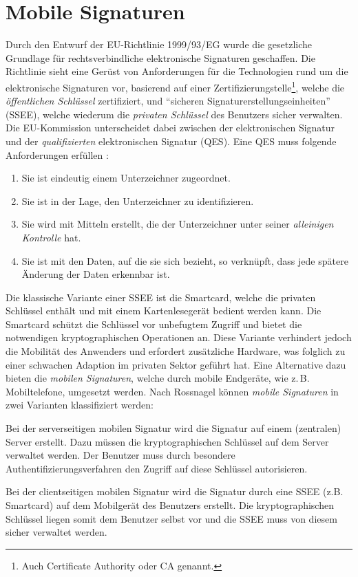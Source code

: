 \documentclass[11pt,a4paper,ngerman]{scrreprt}
\begin{document}
\section{Mobile Signaturen}\label{sec:MobileSignaturen}
Durch den Entwurf der EU-Richtlinie 1999/93/EG wurde die gesetzliche Grundlage für rechtsverbindliche elektronische Signaturen geschaffen. Die Richtlinie sieht eine Gerüst von Anforderungen für die Technologien rund um die elektronische Signaturen vor, basierend auf einer Zertifizierungstelle\footnote{Auch Certificate Authority oder CA genannt.}, welche die \emph{öffentlichen Schlüssel} zertifiziert, und ``sicheren Signaturerstellungseinheiten'' (SSEE), welche wiederum die \emph{privaten Schlüssel} des Benutzers sicher verwalten. Die EU-Kommission unterscheidet dabei zwischen der elektronischen Signatur und der \emph{qualifizierten} elektronischen Signatur (QES). Eine QES muss folgende Anforderungen erfüllen \cite{eSigEU99}:
\begin{enumerate}
    \item Sie ist eindeutig einem Unterzeichner zugeordnet.
    \item Sie ist in der Lage, den Unterzeichner zu identifizieren.
    \item Sie wird mit Mitteln erstellt, die der Unterzeichner unter seiner \emph{alleinigen Kontrolle} hat.
    \item Sie ist mit den Daten, auf die sie sich bezieht, so verknüpft, dass jede spätere Änderung der Daten erkennbar ist.
\end{enumerate}
Die klassische Variante einer SSEE ist die Smartcard, welche die privaten Schlüssel enthält und mit einem Kartenlesegerät bedient werden kann. Die Smartcard schützt die Schlüssel vor unbefugtem Zugriff und bietet die notwendigen kryptographischen Operationen an. Diese Variante verhindert jedoch die Mobilität des Anwenders und erfordert zusätzliche Hardware, was folglich zu einer schwachen Adaption im privaten Sektor geführt hat. Eine Alternative dazu bieten die \textit{mobilen Signaturen}, welche durch mobile Endgeräte, wie z.\,B. Mobiltelefone, umgesetzt werden. Nach Rossnagel \cite{rossnagel} können \textit{mobile Signaturen} in zwei Varianten klassifiziert werden:
\begin{description}[font=\rmfamily]
    \item [Serverseitige mobile Signaturen] Bei der serverseitigen mobilen Signatur wird die Signatur auf einem (zentralen) Server erstellt. Dazu müssen die kryptographischen Schlüssel auf dem Server verwaltet werden. Der Benutzer muss durch besondere Authentifizierungsverfahren den Zugriff auf diese Schlüssel autorisieren.
    \item [Clientseitige mobile Signaturen] Bei der clientseitigen mobilen Signatur wird die Signatur durch eine SSEE (z.B. Smartcard) auf dem Mobilgerät des Benutzers erstellt. Die kryptographischen Schlüssel liegen somit dem Benutzer selbst vor und die SSEE muss von diesem sicher verwaltet werden.
\end{description}
\end{document}
